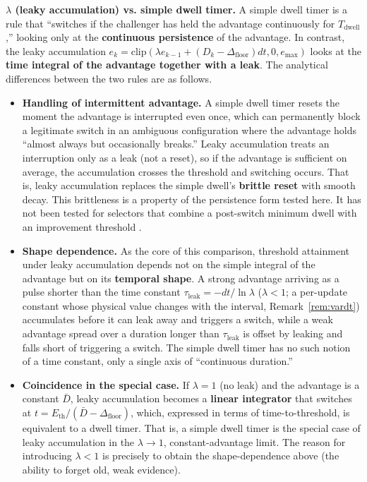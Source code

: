 \documentclass[11pt]{article}
\newcommand{\Dfloor}{\Delta_{\text{floor}}}
\newcommand{\Eth}{E_{\text{th}}}
\begin{document}
\textbf{$\lambda$ (leaky accumulation) vs. simple dwell timer.} A simple dwell timer is a rule that ``switches if the challenger has held the advantage continuously for $T_{\text{dwell}}$,'' looking only at the \textbf{continuous persistence} of the advantage. In contrast, the leaky accumulation $e_k = \mathrm{clip}(\lambda e_{k-1} + (D_k - \Dfloor)dt, 0, e_{\max})$ looks at the \textbf{time integral of the advantage together with a leak}. The analytical differences between the two rules are as follows.

\begin{itemize}
\item \textbf{Handling of intermittent advantage.} A simple dwell timer resets the moment the advantage is interrupted even once, which can permanently block a legitimate switch in an ambiguous configuration where the advantage holds ``almost always but occasionally breaks.'' Leaky accumulation treats an interruption only as a leak (not a reset), so if the advantage is sufficient on average, the accumulation crosses the threshold and switching occurs. That is, leaky accumulation replaces the simple dwell's \textbf{brittle reset} with smooth decay. This brittleness is a property of the persistence form tested here. It has not been tested for selectors that combine a post-switch minimum dwell with an improvement threshold \cite{hespanha1999dwell, li2026bigcbf}.
\item \textbf{Shape dependence.} As the core of this comparison, threshold attainment under leaky accumulation depends not on the simple integral of the advantage but on its \textbf{temporal shape}. A strong advantage arriving as a pulse shorter than the time constant $\tau_{\text{leak}} = -dt/\ln\lambda$ ($\lambda<1$; a per-update constant whose physical value changes with the interval, Remark~\ref{rem:vardt}) accumulates before it can leak away and triggers a switch, while a weak advantage spread over a duration longer than $\tau_{\text{leak}}$ is offset by leaking and falls short of triggering a switch. The simple dwell timer has no such notion of a time constant, only a single axis of ``continuous duration.''
\item \textbf{Coincidence in the special case.} If $\lambda = 1$ (no leak) and the advantage is a constant $\bar D$, leaky accumulation becomes a \textbf{linear integrator} that switches at $t = \Eth/(\bar D - \Dfloor)$, which, expressed in terms of time-to-threshold, is equivalent to a dwell timer. That is, a simple dwell timer is the special case of leaky accumulation in the $\lambda \to 1$, constant-advantage limit. The reason for introducing $\lambda < 1$ is precisely to obtain the shape-dependence above (the ability to forget old, weak evidence).
\end{itemize}
\end{document}
